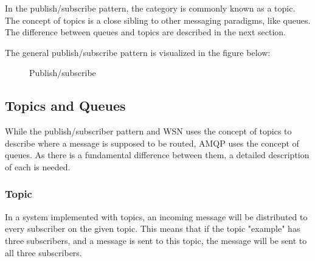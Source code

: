 In the publish/subscribe pattern, the category is commonly known as a topic. The concept of topics is a close sibling to other messaging paradigms, like queues. The difference between queues and topics are described in the next section. 

The general publish/subscribe pattern is visualized in the figure \cite{pub-sub-image} below:

\begin{center}
  \begin{figure}[ht]
    \caption{Publish/subscribe}
    \label{fig:publish-subscribe}
  \end{figure}
\end{center}

\subsection{Topics and Queues}
\label{subsec:architecture_and_implementation-topic_and_queue_differecnce}
While the publish/subscriber pattern and WSN uses the concept of topics to describe where a message is supposed to be routed, AMQP uses the concept of queues. As there is a fundamental difference between them, a detailed description of each is needed.

\subsubsection{Topic}
In a system implemented with topics, an incoming message will be distributed to every subscriber on the given topic. This means that if the topic "example" has three subscribers, and a message is sent to this topic, the message will be sent to all three subscribers.

